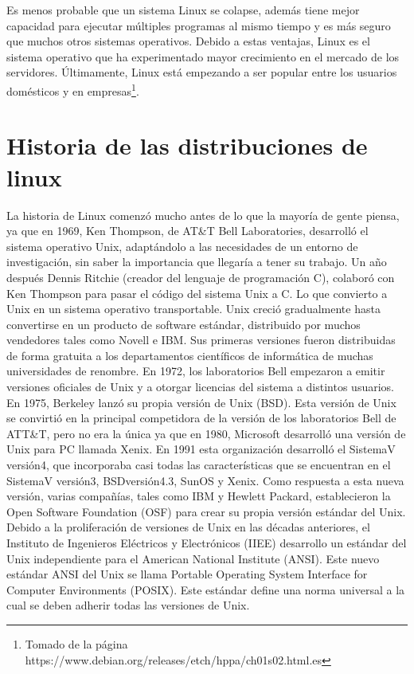 \documentclass[12pt, twoside]{report}
\begin{document}
Es menos probable que un sistema Linux se colapse, además tiene mejor capacidad para ejecutar múltiples programas al mismo tiempo y es más seguro que muchos otros sistemas operativos. Debido a estas ventajas, Linux es el sistema operativo que ha experimentado mayor crecimiento en el mercado de los servidores. Últimamente, Linux está empezando a ser popular entre los usuarios domésticos y en empresas\footnote{Tomado de la página https://www.debian.org/releases/etch/hppa/ch01s02.html.es}.

\section{Historia de las distribuciones de linux}

La historia de Linux comenzó  mucho antes de lo que la mayoría de gente piensa, ya que en 1969, Ken Thompson, de AT\&T Bell Laboratories, desarrolló el sistema operativo Unix, adaptándolo a las necesidades de un entorno de investigación, sin saber la importancia que llegaría a tener su trabajo. Un año después Dennis Ritchie (creador del lenguaje de programación C),  colaboró con Ken Thompson para pasar el código del sistema Unix a C. Lo que convierto a Unix en un sistema operativo transportable.
Unix creció gradualmente hasta convertirse en un producto de software estándar, distribuido por muchos vendedores tales como Novell e IBM. Sus primeras versiones fueron distribuidas de forma gratuita a los departamentos científicos de informática de muchas universidades de renombre.
En 1972, los laboratorios Bell empezaron a emitir versiones oficiales de Unix y a otorgar licencias del sistema a distintos usuarios. En 1975, Berkeley lanzó su propia versión de Unix (BSD). Esta versión de Unix se convirtió en la principal competidora de la versión de los laboratorios Bell de ATT\&T, pero no era la única ya que en 1980, Microsoft desarrolló una versión de Unix para PC llamada Xenix.
En 1991 esta organización desarrolló el SistemaV versión4, que incorporaba casi todas las características que se encuentran en el SistemaV versión3, BSDversión4.3, SunOS y Xenix. Como respuesta a esta nueva versión, varias compañías, tales como IBM y Hewlett Packard, establecieron la Open Software Foundation (OSF) para crear su propia versión estándar del Unix.
Debido a la proliferación de versiones de Unix en las décadas anteriores, el Instituto de Ingenieros Eléctricos y Electrónicos (IIEE) desarrollo un estándar del Unix independiente para el American National Institute (ANSI). Este nuevo estándar ANSI del Unix se llama Portable Operating System Interface for Computer Environments (POSIX). Este estándar define una norma universal a la cual se deben adherir todas las versiones de Unix.
\end{document}
